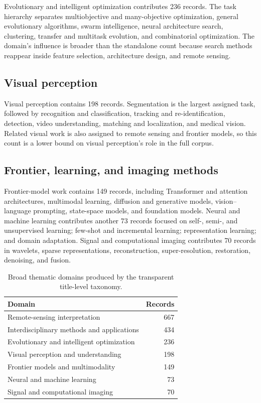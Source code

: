 \documentclass[11pt]{article}
\begin{document}
Evolutionary and intelligent optimization contributes 236 records. The task
hierarchy separates multiobjective and many-objective optimization, general
evolutionary algorithms, swarm intelligence, neural architecture search,
clustering, transfer and multitask evolution, and combinatorial optimization.
The domain's influence is broader than the standalone count because search
methods reappear inside feature selection, architecture design, and remote
sensing.

\subsection{Visual perception}

Visual perception contains 198 records. Segmentation is the largest assigned
task, followed by recognition and classification, tracking and
re-identification, detection, video understanding, matching and localization,
and medical vision. Related visual work is also assigned to remote sensing and
frontier models, so this count is a lower bound on visual perception's role in
the full corpus.

\subsection{Frontier, learning, and imaging methods}

Frontier-model work contains 149 records, including Transformer and attention
architectures, multimodal learning, diffusion and generative models,
vision--language prompting, state-space models, and foundation models. Neural
and machine learning contributes another 73 records focused on self-,
semi-, and unsupervised learning; few-shot and incremental learning;
representation learning; and domain adaptation. Signal and computational
imaging contributes 70 records in wavelets, sparse representations,
reconstruction, super-resolution, restoration, denoising, and fusion.

\begin{table}[ht]
\centering
\caption{Broad thematic domains produced by the transparent title-level taxonomy.}
\label{tab:domains}
\begin{tabular}{lr}
\toprule
Domain & Records \\
\midrule
Remote-sensing interpretation & 667 \\
Interdisciplinary methods and applications & 434 \\
Evolutionary and intelligent optimization & 236 \\
Visual perception and understanding & 198 \\
Frontier models and multimodality & 149 \\
Neural and machine learning & 73 \\
Signal and computational imaging & 70 \\
\bottomrule
\end{tabular}
\end{table}
\end{document}
